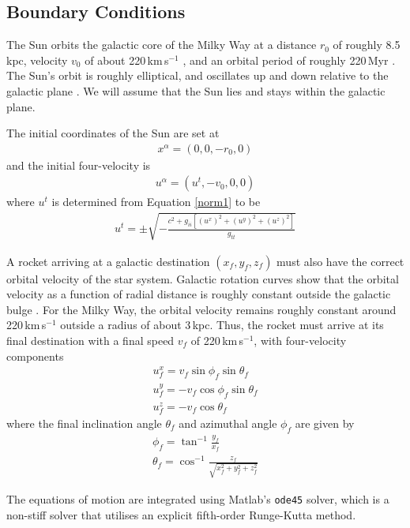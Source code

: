 \documentclass[review]{elsarticle}
\begin{document}
\subsection{Boundary Conditions}

The Sun orbits the galactic core of the Milky Way at a distance $r_0$ of roughly 8.5\,kpc, velocity $v_0$ of about 220\,km\,s$^{-1}$ \citep{Kerr1986}, and an orbital period of roughly 220\,Myr \citep{Seeds2015}. The Sun's orbit is roughly elliptical, and oscillates up and down relative to the galactic plane \citep{Moore2011}. We will assume that the Sun lies and stays within the galactic plane. 

The initial coordinates of the Sun are set at
\begin{gather}
x^\alpha=(0,0,-r_0,0)
\end{gather}
and the initial four-velocity is
\begin{gather}
u^\alpha=(u^t,-v_0,0,0)
\end{gather}
where $u^t$ is determined from Equation \eqref{norm1} to be 
\begin{gather}
u^t=\pm\sqrt{-\frac{c^2+g_{ii}[(u^x)^2+(u^y)^2+(u^z)^2]}{g_{tt}}}
\label{utinit}
\end{gather}

A rocket arriving at a galactic destination $(x_f,y_f,z_f)$ must also have the correct orbital velocity of the star system. Galactic rotation curves show that the orbital velocity as a function of radial distance is roughly constant outside the galactic bulge \citep{Jones2004}. For the Milky Way, the orbital velocity remains roughly constant around 220\,km\,s$^{-1}$ outside a radius of about 3\,kpc. Thus, the rocket must arrive at its final destination with a final speed $v_f$ of 220\,km\,s$^{-1}$, with four-velocity components
\begin{gather}
u_f^x=v_f\sin\phi_f\sin\theta_f\\
u_f^y=-v_f\cos\phi_f\sin\theta_f\\
u_f^z=-v_f\cos\theta_f
\end{gather}
where the final inclination angle $\theta_f$ and azimuthal angle $\phi_f$ are given by
\begin{gather}
\phi_f=\tan^{-1}\frac{y_f}{x_f}
\label{phifeqn}\\
\theta_f=\cos^{-1}\frac{z_f}{\sqrt{x_f^2+y_f^2+z_f^2}}
\label{thetafeqn}
\end{gather}

The equations of motion are integrated using Matlab's \texttt{ode45} solver, which is a non-stiff solver that utilises an explicit fifth-order Runge-Kutta method. 
\end{document}
